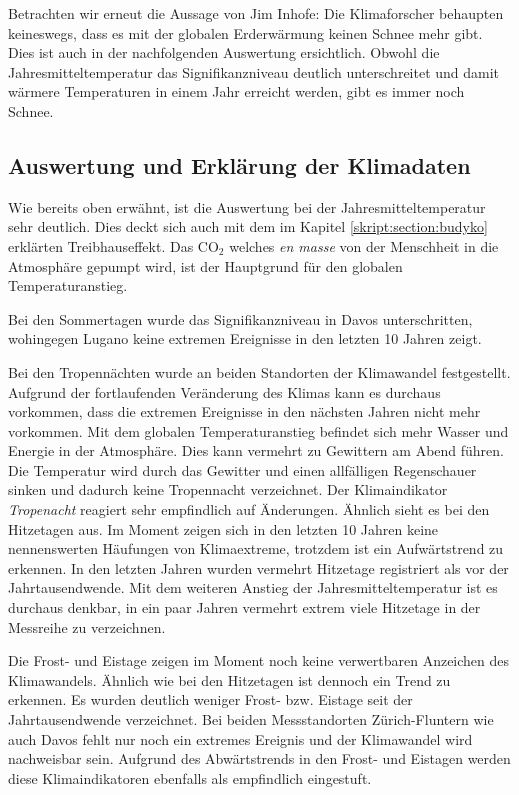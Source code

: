 \begin{refsection}
Betrachten wir erneut die Aussage von Jim Inhofe: Die Klimaforscher behaupten keineswegs, dass es mit der globalen Erderwärmung keinen Schnee mehr gibt. Dies ist auch in der nachfolgenden Auswertung ersichtlich. Obwohl die Jahresmitteltemperatur das Signifikanzniveau deutlich unterschreitet und damit wärmere Temperaturen in einem Jahr erreicht werden, gibt es immer noch Schnee. 

\subsection{Auswertung und Erklärung der Klimadaten}
Wie bereits oben erwähnt, ist die Auswertung bei der Jahresmitteltemperatur sehr deutlich.  Dies deckt sich auch mit dem im Kapitel \ref{skript:section:budyko} erklärten Treibhauseffekt. Das CO$_2$ welches {\em en masse} von der Menschheit in die Atmosphäre gepumpt wird, ist der Hauptgrund für den globalen Temperaturanstieg.

Bei den Sommertagen wurde das Signifikanzniveau in Davos unterschritten, wohingegen Lugano keine extremen Ereignisse in den letzten 10 Jahren zeigt. 

Bei den Tropennächten wurde an beiden Standorten der Klimawandel festgestellt. Aufgrund der fortlaufenden Veränderung des Klimas kann es durchaus vorkommen, dass die extremen Ereignisse in den nächsten Jahren nicht mehr vorkommen. Mit dem globalen Temperaturanstieg befindet sich mehr Wasser und Energie in der Atmosphäre. Dies kann vermehrt zu Gewittern am Abend führen. Die Temperatur wird durch das Gewitter und einen allfälligen Regenschauer sinken und dadurch keine Tropennacht verzeichnet. Der Klimaindikator {\em Tropenacht} reagiert sehr empfindlich auf Änderungen.
%
Ähnlich sieht es bei den Hitzetagen aus. Im Moment zeigen sich in den letzten 10 Jahren keine nennenswerten Häufungen von Klimaextreme, trotzdem ist ein Aufwärtstrend zu erkennen. In den letzten Jahren wurden vermehrt Hitzetage registriert als vor der Jahrtausendwende. Mit dem weiteren Anstieg der Jahresmitteltemperatur ist es durchaus denkbar, in ein paar Jahren vermehrt extrem viele Hitzetage in der Messreihe zu verzeichnen.

Die Frost- und Eistage zeigen im Moment noch keine verwertbaren Anzeichen des Klimawandels. Ähnlich wie bei den Hitzetagen ist dennoch ein Trend zu erkennen. Es wurden deutlich weniger Frost- bzw. Eistage seit der Jahrtausendwende verzeichnet. Bei beiden Messstandorten Zürich-Fluntern wie auch Davos fehlt nur noch ein extremes Ereignis und der Klimawandel wird nachweisbar sein. Aufgrund des Abwärtstrends in den Frost- und Eistagen werden diese Klimaindikatoren ebenfalls als empfindlich eingestuft.


\end{refsection}
